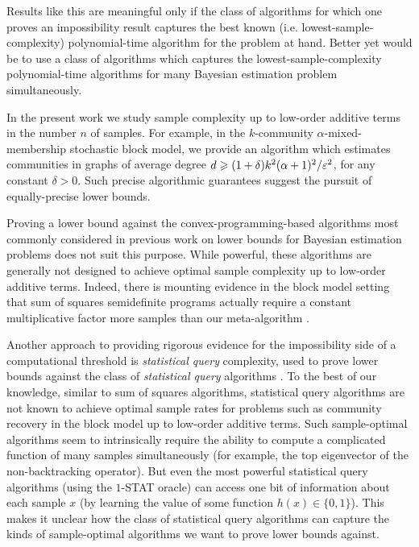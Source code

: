 Results like this are meaningful only if the class of algorithms for which one proves an impossibility result captures the best known (i.e. lowest-sample-complexity) polynomial-time algorithm for the problem at hand.
Better yet would be to use a class of algorithms which captures the lowest-sample-complexity polynomial-time algorithms for many Bayesian estimation problem simultaneously.

In the present work we study sample complexity up to low-order additive terms in the number $n$ of samples.
For example, in the $k$-community $\alpha$-mixed-membership stochastic block model, we provide an algorithm which estimates communities in graphs of average degree $d \geqslant (1 + \delta) k^2 (\alpha+1)^2/\varepsilon^2$, for any constant $\delta > 0$.
Such precise algorithmic guarantees suggest the pursuit of equally-precise lower bounds.

Proving a lower bound against the convex-programming-based algorithms most commonly considered in previous work on lower bounds for Bayesian estimation problems does not suit this purpose.
While powerful, these algorithms are generally not designed to achieve optimal sample complexity up to low-order additive terms.
Indeed, there is mounting evidence in the block model setting that sum of squares semidefinite programs actually require a constant multiplicative factor more samples than our meta-algorithm \cite{DBLP:conf/stoc/MontanariS16, DBLP:conf/approx/BanksKM17}.

Another approach to providing rigorous evidence for the impossibility side of a computational threshold is \emph{statistical query} complexity, used to prove lower bounds against the class of \emph{statistical query} algorithms \cite{DBLP:conf/stoc/FeldmanGRVX13,DBLP:journals/corr/FeldmanGV15,DBLP:conf/stoc/FeldmanPV15}.
To the best of our knowledge, similar to sum of squares algorithms, statistical query algorithms are not known to achieve optimal sample rates for problems such as community recovery in the block model up to low-order additive terms.
Such sample-optimal algorithms seem to intrinsically require the ability to compute a complicated function of many samples simultaneously (for example, the top eigenvector of the non-backtracking operator).
But even the most powerful statistical query algorithms (using the $1$-STAT oracle) can access one bit of information about each sample $x$ (by learning the value of some function $h(x) \in \{0,1\}$).
This makes it unclear how the class of statistical query algorithms can capture the kinds of sample-optimal algorithms we want to prove lower bounds against.

